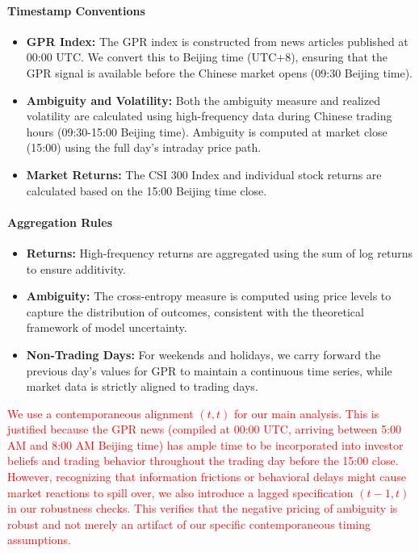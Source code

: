 \documentclass[preprint,12pt,authoryear]{elsarticle}
\begin{document}
\paragraph{Timestamp Conventions}
\begin{itemize}
    \item \textbf{GPR Index:} The GPR index is constructed from news articles published at 00:00 UTC. We convert this to Beijing time (UTC+8), ensuring that the GPR signal is available before the Chinese market opens (09:30 Beijing time).
    \item \textbf{Ambiguity and Volatility:} Both the ambiguity measure and realized volatility are calculated using high-frequency data during Chinese trading hours (09:30-15:00 Beijing time). Ambiguity is computed at market close (15:00) using the full day's intraday price path.
    \item \textbf{Market Returns:} The CSI 300 Index and individual stock returns are calculated based on the 15:00 Beijing time close.
\end{itemize}

\paragraph{Aggregation Rules}
\begin{itemize}
    \item \textbf{Returns:} High-frequency returns are aggregated using the sum of log returns to ensure additivity.
    \item \textbf{Ambiguity:} The cross-entropy measure is computed using price levels to capture the distribution of outcomes, consistent with the theoretical framework of model uncertainty.
    \item \textbf{Non-Trading Days:} For weekends and holidays, we carry forward the previous day's values for GPR to maintain a continuous time series, while market data is strictly aligned to trading days.
\end{itemize}

\textcolor{red}{We use a contemporaneous alignment $(t, t)$ for our main analysis. This is justified because the GPR news (compiled at 00:00 UTC, arriving between 5:00 AM and 8:00 AM Beijing time) has ample time to be incorporated into investor beliefs and trading behavior throughout the trading day before the 15:00 close. However, recognizing that information frictions or behavioral delays might cause market reactions to spill over, we also introduce a lagged specification $(t-1, t)$ in our robustness checks. This verifies that the negative pricing of ambiguity is robust and not merely an artifact of our specific contemporaneous timing assumptions.} 
\end{document}
